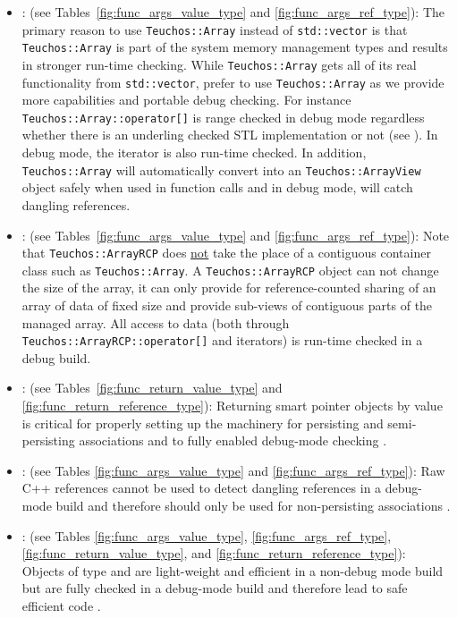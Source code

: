 \begin{itemize}
{}\item\GCGTeuchosArray: (see Tables~\ref{fig:func_args_value_type} and
{}\ref{fig:func_args_ref_type}): The primary reason to use
{}\texttt{Teuchos::\-Array} instead of {}\texttt{std::\-vector} is that
{}\texttt{Teuchos::\-Array} is part of the system memory management types and
results in stronger run-time checking.  While {}\texttt{Teuchos::\-Array} gets
all of its real functionality from {}\texttt{std::\-vector}, prefer to use
{}\texttt{Teuchos::\-Array} as we provide more capabilities and portable debug
checking.  For instance {}\texttt{Teuchos::\-Array::\-operator[]} is range
checked in debug mode regardless whether there is an underling checked STL
implementation or not (see {}\cite[Item 83]{C++CodingStandards05}).  In debug
mode, the iterator is also run-time checked.  In addition,
{}\texttt{Teuchos\-::Array} will automatically convert into an
{}\texttt{Teuchos\-::ArrayView} object safely when used in function calls and
in debug mode, will catch dangling references.


{}\item\GCGTeuchosArrayRCP: (see Tables~\ref{fig:func_args_value_type} and
{}\ref{fig:func_args_ref_type}): Note that {}\texttt{Teuchos::ArrayRCP} does
{}\underline{not} take the place of a contiguous container class such as
{}\texttt{Teuchos::\-Array}.  A {}\texttt{Teuchos::ArrayRCP} object can not
change the size of the array, it can only provide for reference-counted
sharing of an array of data of fixed size and provide sub-views of contiguous
parts of the managed array.  All access to data (both through
{}\texttt{Teuchos::\-ArrayRCP::\-operator[]} and iterators) is run-time checked
in a debug build.


{}\item\GCGReturnSmartPointersByValue: (see
Tables~\ref{fig:func_return_value_type} and
{}\ref{fig:func_return_reference_type}): Returning smart pointer
objects by value is critical for properly setting up the machinery for
persisting and semi-persisting associations and to fully enabled
debug-mode checking {}\cite{TeuchosMemoryManagementGuide}.


{}\item\GCGRawReferencesNonPersisting: (see Tables
{}\ref{fig:func_args_value_type} and {}\ref{fig:func_args_ref_type}):
Raw C++ references cannot be used to detect dangling references in a
debug-mode build and therefore should only be used for non-persisting
associations {}\cite{TeuchosMemoryManagementGuide}.


{}\item\GCGSemiPersisting: (see Tables
{}\ref{fig:func_args_value_type}, {}\ref{fig:func_args_ref_type},
{}\ref{fig:func_return_value_type}, and
{}\ref{fig:func_return_reference_type}): Objects of type {}
and {} are light-weight and efficient in a non-debug
mode build but are fully checked in a debug-mode build and therefore
lead to safe efficient code {}\cite{TeuchosMemoryManagementGuide}.



\end{itemize}
